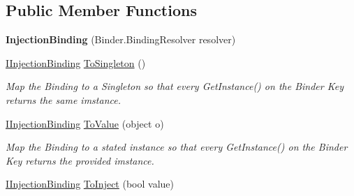 \subsection*{Public Member Functions}
\begin{DoxyCompactItemize}
\item 
\hypertarget{classstrange_1_1extensions_1_1injector_1_1impl_1_1_injection_binding_ac7cd5da2e7c65f4e60dddc4adeb76aa3}{{\bfseries Injection\-Binding} (Binder.\-Binding\-Resolver resolver)}\label{classstrange_1_1extensions_1_1injector_1_1impl_1_1_injection_binding_ac7cd5da2e7c65f4e60dddc4adeb76aa3}

\item 
\hypertarget{classstrange_1_1extensions_1_1injector_1_1impl_1_1_injection_binding_a0e91d1685d6518e622468bf26e55cd02}{\hyperlink{interfacestrange_1_1extensions_1_1injector_1_1api_1_1_i_injection_binding}{I\-Injection\-Binding} \hyperlink{classstrange_1_1extensions_1_1injector_1_1impl_1_1_injection_binding_a0e91d1685d6518e622468bf26e55cd02}{To\-Singleton} ()}\label{classstrange_1_1extensions_1_1injector_1_1impl_1_1_injection_binding_a0e91d1685d6518e622468bf26e55cd02}

\begin{DoxyCompactList}\small\item\em Map the Binding to a Singleton so that every {\ttfamily Get\-Instance()} on the Binder Key returns the same imstance. \end{DoxyCompactList}\item 
\hypertarget{classstrange_1_1extensions_1_1injector_1_1impl_1_1_injection_binding_a2d5492d1aec7dc4b48f5670e4eb35bde}{\hyperlink{interfacestrange_1_1extensions_1_1injector_1_1api_1_1_i_injection_binding}{I\-Injection\-Binding} \hyperlink{classstrange_1_1extensions_1_1injector_1_1impl_1_1_injection_binding_a2d5492d1aec7dc4b48f5670e4eb35bde}{To\-Value} (object o)}\label{classstrange_1_1extensions_1_1injector_1_1impl_1_1_injection_binding_a2d5492d1aec7dc4b48f5670e4eb35bde}

\begin{DoxyCompactList}\small\item\em Map the Binding to a stated instance so that every {\ttfamily Get\-Instance()} on the Binder Key returns the provided imstance. \end{DoxyCompactList}\item 
\hypertarget{classstrange_1_1extensions_1_1injector_1_1impl_1_1_injection_binding_a03d3a22f0e3cad47d20c337d7a5aa224}{\hyperlink{interfacestrange_1_1extensions_1_1injector_1_1api_1_1_i_injection_binding}{I\-Injection\-Binding} \hyperlink{classstrange_1_1extensions_1_1injector_1_1impl_1_1_injection_binding_a03d3a22f0e3cad47d20c337d7a5aa224}{To\-Inject} (bool value)}\label{classstrange_1_1extensions_1_1injector_1_1impl_1_1_injection_binding_a03d3a22f0e3cad47d20c337d7a5aa224}


\end{DoxyCompactItemize}
